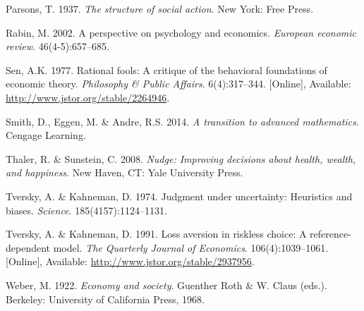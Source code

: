 \documentclass[11pt,preprint, authoryear]{elsarticle}
\numberwithin{equation}{section}
\numberwithin{figure}{section}
\numberwithin{table}{section}
\newlength{\cslhangindent}
\newenvironment{CSLReferences}%
  {\setlength{\parindent}{0pt}%
  \everypar{\setlength{\hangindent}{\cslhangindent}}\ignorespaces}%
  {\par}
\begin{document}
\begin{CSLReferences}{1}{0}
\leavevmode\hypertarget{ref-parsons}{}%
Parsons, T. 1937. \emph{The structure of social action}. New York: Free
Press.

\leavevmode\hypertarget{ref-rabin}{}%
Rabin, M. 2002. A perspective on psychology and economics.
\emph{European economic review}. 46(4-5):657--685.

\leavevmode\hypertarget{ref-sen}{}%
Sen, A.K. 1977. Rational fools: A critique of the behavioral foundations
of economic theory. \emph{Philosophy \& Public Affairs}. 6(4):317--344.
{[}Online{]}, Available: \url{http://www.jstor.org/stable/2264946}.

\leavevmode\hypertarget{ref-math}{}%
Smith, D., Eggen, M. \& Andre, R.S. 2014. \emph{A transition to advanced
mathematics}. Cengage Learning.

\leavevmode\hypertarget{ref-nudge}{}%
Thaler, R. \& Sunstein, C. 2008. \emph{Nudge: Improving decisions about
health, wealth, and happiness.} New Haven, CT: Yale University Press.

\leavevmode\hypertarget{ref-khan}{}%
Tversky, A. \& Kahneman, D. 1974. Judgment under uncertainty: Heuristics
and biases. \emph{Science}. 185(4157):1124--1131.

\leavevmode\hypertarget{ref-ref}{}%
Tversky, A. \& Kahneman, D. 1991. Loss aversion in riskless choice: A
reference-dependent model. \emph{The Quarterly Journal of Economics}.
106(4):1039--1061. {[}Online{]}, Available:
\url{http://www.jstor.org/stable/2937956}.

\leavevmode\hypertarget{ref-weber}{}%
Weber, M. 1922. \emph{Economy and society}. Guenther Roth \& W. Claus
(eds.). Berkeley: University of California Press, 1968.

\end{CSLReferences}


\end{document}
